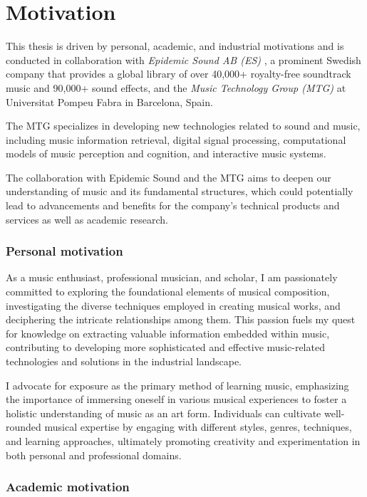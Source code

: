 \section{Motivation}

This thesis is driven by personal, academic, and industrial motivations and is conducted in collaboration with \textit{Epidemic Sound AB (ES)} \cite{EpidemicSite}, a prominent Swedish company that provides a global library of over 40,000+ royalty-free soundtrack music and 90,000+ sound effects, and the \textit{Music Technology Group (MTG)} at Universitat Pompeu Fabra in Barcelona, Spain. 

The MTG specializes in developing new technologies related to sound and music, including music information retrieval, digital signal processing, computational models of music perception and cognition, and interactive music systems. 

The collaboration with Epidemic Sound and the MTG aims to deepen our understanding of music and its fundamental structures, which could potentially lead to advancements and benefits for the company's technical products and services as well as academic research.

\subsubsection{Personal motivation}

As a music enthusiast, professional musician, and scholar, I am passionately committed to exploring the foundational elements of musical composition, investigating the diverse techniques employed in creating musical works, and deciphering the intricate relationships among them. This passion fuels my quest for knowledge on extracting valuable information embedded within music, contributing to developing more sophisticated and effective music-related technologies and solutions in the industrial landscape.

I advocate for exposure as the primary method of learning music, emphasizing the importance of immersing oneself in various musical experiences to foster a holistic understanding of music as an art form. Individuals can cultivate well-rounded musical expertise by engaging with different styles, genres, techniques, and learning approaches, ultimately promoting creativity and experimentation in both personal and professional domains.

\subsubsection{Academic motivation}

